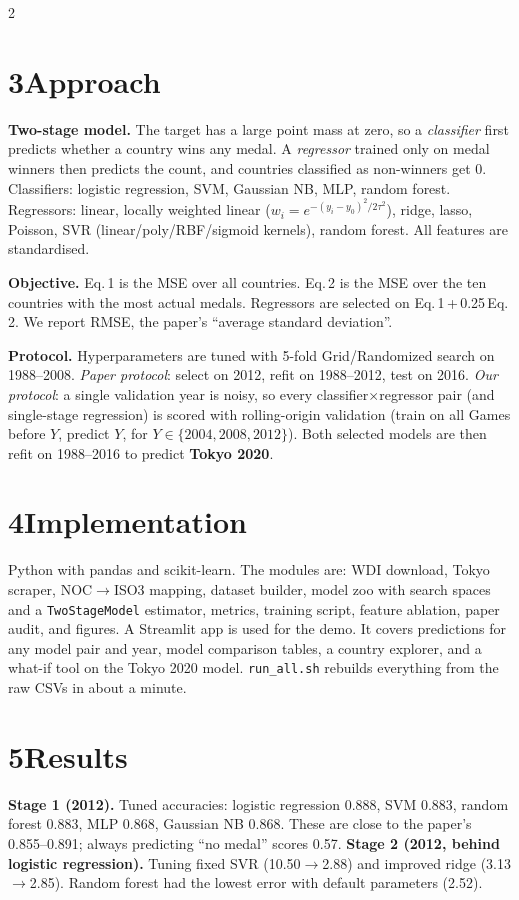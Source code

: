 \documentclass[10pt]{article}
\begin{document}
\begin{multicols}{2}
\section*{3\quad Approach}
\textbf{Two-stage model.} The target has a large point mass at zero, so a \emph{classifier} first predicts whether
a country wins any medal. A \emph{regressor} trained only on medal winners then predicts the count, and countries
classified as non-winners get 0. Classifiers: logistic regression, SVM, Gaussian NB, MLP, random forest.
Regressors: linear, locally weighted linear ($w_i=e^{-(y_i-y_0)^2/2\tau^2}$), ridge, lasso, Poisson, SVR
(linear/poly/RBF/sigmoid kernels), random forest. All features are standardised.

\textbf{Objective.} Eq.\,1 is the MSE over all countries. Eq.\,2 is the MSE over the ten countries with the
most actual medals. Regressors are selected on Eq.\,1\,+\,0.25\,Eq.\,2. We report RMSE, the paper's ``average
standard deviation''.

\textbf{Protocol.} Hyperparameters are tuned with 5-fold Grid/Randomized search on 1988--2008.
\emph{Paper protocol}: select on 2012, refit on 1988--2012, test on 2016.
\emph{Our protocol}: a single validation year is noisy, so every classifier$\times$regressor pair (and single-stage
regression) is scored with rolling-origin validation (train on all Games before $Y$, predict $Y$, for
$Y\in\{2004,2008,2012\}$). Both selected models are then refit on 1988--2016 to predict \textbf{Tokyo 2020}.

\section*{4\quad Implementation}
Python with pandas and scikit-learn. The modules are: WDI download, Tokyo scraper, NOC$\to$ISO3 mapping, dataset
builder, model zoo with search spaces and a \texttt{TwoStageModel} estimator, metrics, training script, feature
ablation, paper audit, and figures. A Streamlit app is used for the demo. It covers predictions for any model pair and
year, model comparison tables, a country explorer, and a what-if tool on the Tokyo 2020 model.
\texttt{run\_all.sh} rebuilds everything from the raw CSVs in about a minute.

\section*{5\quad Results}
\textbf{Stage 1 (2012).} Tuned accuracies: logistic regression 0.888, SVM 0.883, random forest 0.883,
MLP 0.868, Gaussian NB 0.868. These are close to the paper's 0.855--0.891; always predicting ``no medal'' scores 0.57.
\textbf{Stage 2 (2012, behind logistic regression).} Tuning fixed SVR (10.50$\to$2.88) and improved ridge
(3.13$\to$2.85). Random forest had the lowest error with default parameters (2.52).


\end{multicols}
\end{document}
